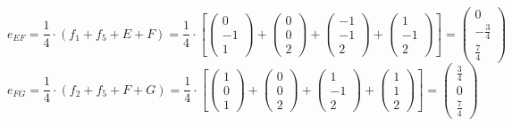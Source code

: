 \documentclass{article}
\begin{document}
\[e_{EF}=\frac{1}{4}\cdot(f_1+f_5+E+F)=\frac{1}{4}\cdot\left[
\left({\begin{array}{c} 0 \\  -1 \\ 1 \end{array}}\right)+
\left({\begin{array}{c} 0 \\ 0 \\ 2 \end{array}}\right)+
\left({\begin{array}{c} -1 \\ -1 \\ 2 \end{array}}\right)+
\left({\begin{array}{c} 1 \\  -1 \\ 2 \end{array}}\right)\right]=
\left({\begin{array}{c}  0 \\ -\frac{3}{4} \\ \frac{7}{4} \end{array}}\right)
\]
\[e_{FG}=\frac{1}{4}\cdot(f_2+f_5+F+G)=\frac{1}{4}\cdot\left[
\left({\begin{array}{c} 1 \\  0 \\ 1 \end{array}}\right)+
\left({\begin{array}{c} 0 \\ 0 \\ 2 \end{array}}\right)+
\left({\begin{array}{c} 1 \\ -1 \\ 2 \end{array}}\right)+
\left({\begin{array}{c} 1 \\  1 \\ 2 \end{array}}\right)\right]=
\left({\begin{array}{c}  \frac{3}{4} \\ 0 \\ \frac{7}{4} \end{array}}\right)
\]
\end{document}
